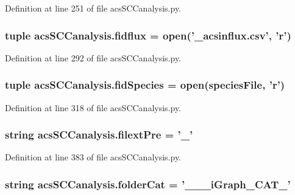 Definition at line 251 of file acs\-S\-C\-Canalysis.\-py.

\hypertarget{a00097_a0c40e4d9928e8df792b31c7a431d3fba}{
\subsubsection[{fidflux}]{\setlength{\rightskip}{0pt plus 5cm}tuple acs\-S\-C\-Canalysis.\-fidflux = open('\-\_\-acsinflux.\-csv', '{\bf r}')}}\label{a00097_a0c40e4d9928e8df792b31c7a431d3fba}


Definition at line 292 of file acs\-S\-C\-Canalysis.\-py.

\hypertarget{a00097_aba2f982879776e057b35971b3653549e}{
\subsubsection[{fid\-Species}]{\setlength{\rightskip}{0pt plus 5cm}tuple acs\-S\-C\-Canalysis.\-fid\-Species = open({\bf species\-File}, '{\bf r}')}}\label{a00097_aba2f982879776e057b35971b3653549e}


Definition at line 318 of file acs\-S\-C\-Canalysis.\-py.

\hypertarget{a00097_a60ff937c050eef601bd84134d1913d8a}{
\subsubsection[{filext\-Pre}]{\setlength{\rightskip}{0pt plus 5cm}string acs\-S\-C\-Canalysis.\-filext\-Pre = '\-\_\-'}}\label{a00097_a60ff937c050eef601bd84134d1913d8a}


Definition at line 383 of file acs\-S\-C\-Canalysis.\-py.

\hypertarget{a00097_a1cbfd083273176eebfe0260e8384acef}{
\subsubsection[{folder\-Cat}]{\setlength{\rightskip}{0pt plus 5cm}string acs\-S\-C\-Canalysis.\-folder\-Cat = '\-\_\-\-\_\-\_\-i\-Graph\-\_\-\-C\-A\-T\-\_\-'}}\label{a00097_a1cbfd083273176eebfe0260e8384acef}



